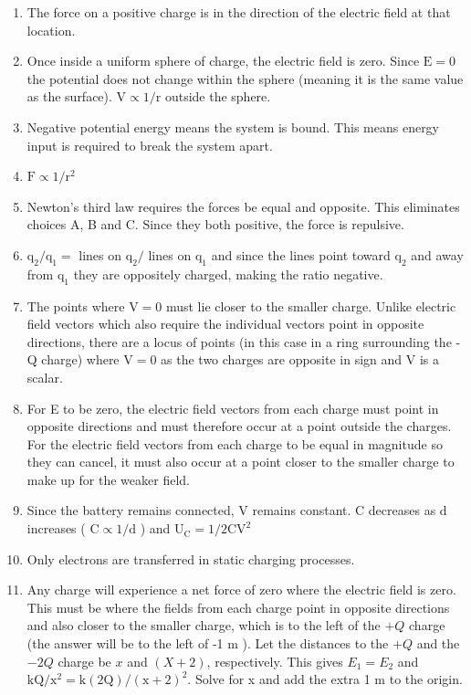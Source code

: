 \begin{enumerate}
\begin{enumerate}
  \item The force on a positive charge is in the direction of the electric field at that location.
  \item Once inside a uniform sphere of charge, the electric field is zero. Since $\mathrm{E}=0$ the potential does not change within the sphere (meaning it is the same value as the surface). $\mathrm{V} \propto 1 / \mathrm{r}$ outside the sphere.
  \item Negative potential energy means the system is bound. This means energy input is required to break the system apart.
  \item $\mathrm{F} \propto 1 / \mathrm{r}^{2}$
  \item Newton's third law requires the forces be equal and opposite. This eliminates choices A, B and C. Since they both positive, the force is repulsive.
  \item $\mathrm{q}_{2} / \mathrm{q}_{1}=$ lines on $\mathrm{q}_{2} /$ lines on $\mathrm{q}_{1}$ and since the lines point toward $\mathrm{q}_{2}$ and away from $\mathrm{q}_{1}$ they are oppositely charged, making the ratio negative.
  \item The points where $\mathrm{V}=0$ must lie closer to the smaller charge. Unlike electric field vectors which also require the individual vectors point in opposite directions, there are a locus of points (in this case in a ring surrounding the -Q charge) where $\mathrm{V}=0$ as the two charges are opposite in sign and V is a scalar.
  \item For E to be zero, the electric field vectors from each charge must point in opposite directions and must therefore occur at a point outside the charges. For the electric field vectors from each charge to be equal in magnitude so they can cancel, it must also occur at a point closer to the smaller charge to make up for the weaker field.
  \item Since the battery remains connected, V remains constant. C decreases as d increases ( $\mathrm{C} \propto 1 / \mathrm{d}$ ) and $\mathrm{U}_{\mathrm{C}}=1 / 2 \mathrm{CV}^{2}$
  \item Only electrons are transferred in static charging processes.
  \item Any charge will experience a net force of zero where the electric field is zero. This must be where the fields from each charge point in opposite directions and also closer to the smaller charge, which is to the left of the $+Q$ charge (the answer will be to the left of -1 m ). Let the distances to the $+Q$ and the $-2 Q$ charge be $x$ and $(X+2)$, respectively. This gives $E_{1}=E_{2}$ and $\mathrm{kQ} / \mathrm{x}^{2}=\mathrm{k}(2 \mathrm{Q}) /(\mathrm{x}+2)^{2}$. Solve for x and add the extra 1 m to the origin.

\end{enumerate}
\end{enumerate}
